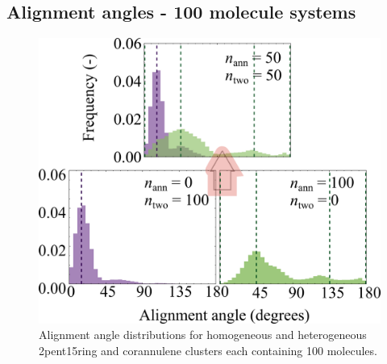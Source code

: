 \subsection{Alignment angles - 100 molecule systems}
%
\begin{figure}[!tbh]
\centering
\includegraphics[width=0.5\linewidth]{Figures/alignment_angle_hetero_SI_draft.png}
\caption{Alignment angle distributions for homogeneous and heterogeneous 2pent15ring and corannulene clusters each containing 100 molecules.}
\label{figSI:alignmentangles_100}
\end{figure}
%

